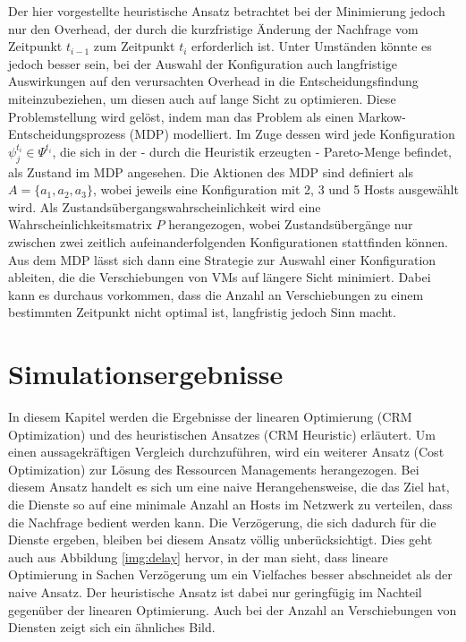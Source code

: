 \documentclass[conference]{IEEEtran}
\begin{document}
Der hier vorgestellte heuristische Ansatz betrachtet bei der Minimierung jedoch nur den Overhead, der durch die kurzfristige Änderung der Nachfrage vom Zeitpunkt \(t_{i-1}\) zum Zeitpunkt \(t_i\) erforderlich ist. Unter Umständen könnte es jedoch besser sein, bei der Auswahl der Konfiguration auch langfristige Auswirkungen auf den verursachten Overhead in die Entscheidungsfindung miteinzubeziehen, um diesen auch auf lange Sicht zu optimieren.
Diese Problemstellung wird gelöst, indem man das Problem als einen Markow-Entscheidungsprozess (MDP) modelliert. Im Zuge dessen wird jede Konfiguration \(\psi_j^{t_i} \in \Psi^{t_i}\), die sich in der - durch die Heuristik erzeugten - Pareto-Menge befindet, als Zustand im MDP angesehen. Die Aktionen des MDP sind definiert als 
\(A=\{a_1,a_2,a_3\}\), wobei jeweils eine Konfiguration mit 2, 3 und 5 Hosts ausgewählt wird.  Als Zustandsübergangswahrscheinlichkeit wird eine Wahrscheinlichkeitsmatrix \(P\) herangezogen, wobei Zustandsübergänge nur zwischen zwei zeitlich aufeinanderfolgenden Konfigurationen stattfinden können.
Aus dem MDP lässt sich dann eine Strategie zur Auswahl einer Konfiguration ableiten, die die Verschiebungen von VMs auf längere Sicht minimiert. Dabei kann es durchaus vorkommen, dass die Anzahl an Verschiebungen zu einem bestimmten Zeitpunkt nicht optimal ist, langfristig jedoch Sinn macht.


\section{Simulationsergebnisse}

In diesem Kapitel werden die Ergebnisse der linearen Optimierung (CRM Optimization) und des heuristischen Ansatzes (CRM Heuristic) erläutert. Um einen aussagekräftigen Vergleich durchzuführen, wird ein weiterer Ansatz (Cost Optimization) zur Lösung des Ressourcen Managements herangezogen. Bei diesem Ansatz handelt es sich um eine naive Herangehensweise, die das Ziel hat, die Dienste so auf eine minimale Anzahl an Hosts im Netzwerk zu verteilen, dass die Nachfrage bedient werden kann. Die Verzögerung, die sich dadurch für die Dienste ergeben, bleiben bei diesem Ansatz völlig unberücksichtigt. Dies geht auch aus Abbildung \ref{img:delay} hervor, in der man sieht, dass lineare Optimierung in Sachen Verzögerung um ein Vielfaches besser abschneidet als der naive Ansatz.  
Der heuristische Ansatz ist dabei nur geringfügig im Nachteil gegenüber der linearen Optimierung. 
Auch bei der Anzahl an Verschiebungen von Diensten zeigt sich ein ähnliches Bild.
\end{document}
